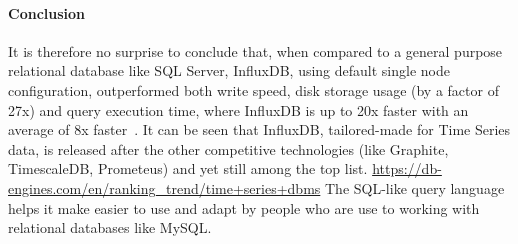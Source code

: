 \paragraph{Conclusion}
It is therefore no surprise to conclude that, when compared to a general purpose relational database like SQL Server, InfluxDB, using default single node configuration, outperformed both write speed, disk storage usage (by a factor of 27x) and query execution time, where InfluxDB is up to 20x faster with an average of 8x faster~\cite{Misc:noor_2017_universit}.
It can be seen that InfluxDB, tailored-made for Time Series data, is released after the other competitive technologies (like Graphite, TimescaleDB, Prometeus) and yet still among the top list. \url{https://db-engines.com/en/ranking_trend/time+series+dbms}
The SQL-like query language helps it make easier to use and adapt by people who are use to working with relational databases like MySQL.
